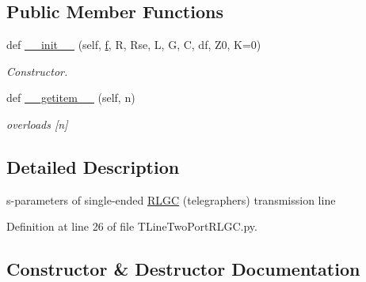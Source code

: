 \subsection*{Public Member Functions}
\begin{DoxyCompactItemize}
\item 
def \hyperlink{classSignalIntegrity_1_1SParameters_1_1Devices_1_1TLineTwoPortRLGC_1_1TLineTwoPortRLGC_a44ea5b94b16c4f9a8ae2b0266c7434d8}{\+\_\+\+\_\+init\+\_\+\+\_\+} (self, \hyperlink{classSignalIntegrity_1_1SParameters_1_1SParameters_1_1SParameters_a32e7a34d6837fe949b413c852a0447f8}{f}, R, Rse, L, G, C, df, Z0, K=0)
\begin{DoxyCompactList}\small\item\em Constructor. \end{DoxyCompactList}\item 
def \hyperlink{classSignalIntegrity_1_1SParameters_1_1Devices_1_1TLineTwoPortRLGC_1_1TLineTwoPortRLGC_ab7a6da5139e0878b590d68292aaa70f2}{\+\_\+\+\_\+getitem\+\_\+\+\_\+} (self, n)
\begin{DoxyCompactList}\small\item\em overloads \mbox{[}n\mbox{]} \end{DoxyCompactList}\end{DoxyCompactItemize}


\subsection{Detailed Description}
s-\/parameters of single-\/ended \hyperlink{namespaceSignalIntegrity_1_1SParameters_1_1RLGC}{R\+L\+GC} (telegraphers) transmission line 

Definition at line 26 of file T\+Line\+Two\+Port\+R\+L\+G\+C.\+py.



\subsection{Constructor \& Destructor Documentation}
\mbox{\label{classSignalIntegrity_1_1SParameters_1_1Devices_1_1TLineTwoPortRLGC_1_1TLineTwoPortRLGC_a44ea5b94b16c4f9a8ae2b0266c7434d8}} 
